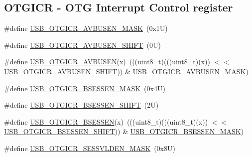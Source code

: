 \subsection*{O\+T\+G\+I\+CR -\/ O\+TG Interrupt Control register}
\begin{DoxyCompactItemize}
\item 
\#define \mbox{\hyperlink{group___u_s_b___register___masks_ga7754d512762167f81175b40ed5243050}{U\+S\+B\+\_\+\+O\+T\+G\+I\+C\+R\+\_\+\+A\+V\+B\+U\+S\+E\+N\+\_\+\+M\+A\+SK}}~(0x1\+U)
\item 
\#define \mbox{\hyperlink{group___u_s_b___register___masks_gac9ca8070fe9426a83bc59be69471edd3}{U\+S\+B\+\_\+\+O\+T\+G\+I\+C\+R\+\_\+\+A\+V\+B\+U\+S\+E\+N\+\_\+\+S\+H\+I\+FT}}~(0\+U)
\item 
\#define \mbox{\hyperlink{group___u_s_b___register___masks_ga06f194e929b2900d37dc38947dad3494}{U\+S\+B\+\_\+\+O\+T\+G\+I\+C\+R\+\_\+\+A\+V\+B\+U\+S\+EN}}(x)~(((uint8\+\_\+t)(((uint8\+\_\+t)(x)) $<$$<$ \mbox{\hyperlink{group___u_s_b___register___masks_gac9ca8070fe9426a83bc59be69471edd3}{U\+S\+B\+\_\+\+O\+T\+G\+I\+C\+R\+\_\+\+A\+V\+B\+U\+S\+E\+N\+\_\+\+S\+H\+I\+FT}})) \& \mbox{\hyperlink{group___u_s_b___register___masks_ga7754d512762167f81175b40ed5243050}{U\+S\+B\+\_\+\+O\+T\+G\+I\+C\+R\+\_\+\+A\+V\+B\+U\+S\+E\+N\+\_\+\+M\+A\+SK}})
\item 
\#define \mbox{\hyperlink{group___u_s_b___register___masks_ga509dfbaf7a85ddbd9b7b61a1d5032cf1}{U\+S\+B\+\_\+\+O\+T\+G\+I\+C\+R\+\_\+\+B\+S\+E\+S\+S\+E\+N\+\_\+\+M\+A\+SK}}~(0x4\+U)
\item 
\#define \mbox{\hyperlink{group___u_s_b___register___masks_gad6d45208ed6411e439be457224176789}{U\+S\+B\+\_\+\+O\+T\+G\+I\+C\+R\+\_\+\+B\+S\+E\+S\+S\+E\+N\+\_\+\+S\+H\+I\+FT}}~(2\+U)
\item 
\#define \mbox{\hyperlink{group___u_s_b___register___masks_ga71e9f843e6727f7f1e7692749d58710a}{U\+S\+B\+\_\+\+O\+T\+G\+I\+C\+R\+\_\+\+B\+S\+E\+S\+S\+EN}}(x)~(((uint8\+\_\+t)(((uint8\+\_\+t)(x)) $<$$<$ \mbox{\hyperlink{group___u_s_b___register___masks_gad6d45208ed6411e439be457224176789}{U\+S\+B\+\_\+\+O\+T\+G\+I\+C\+R\+\_\+\+B\+S\+E\+S\+S\+E\+N\+\_\+\+S\+H\+I\+FT}})) \& \mbox{\hyperlink{group___u_s_b___register___masks_ga509dfbaf7a85ddbd9b7b61a1d5032cf1}{U\+S\+B\+\_\+\+O\+T\+G\+I\+C\+R\+\_\+\+B\+S\+E\+S\+S\+E\+N\+\_\+\+M\+A\+SK}})
\item 
\#define \mbox{\hyperlink{group___u_s_b___register___masks_ga35e32e6ed718719eb90a5aa7b8af10f3}{U\+S\+B\+\_\+\+O\+T\+G\+I\+C\+R\+\_\+\+S\+E\+S\+S\+V\+L\+D\+E\+N\+\_\+\+M\+A\+SK}}~(0x8\+U)

\end{DoxyCompactItemize}
